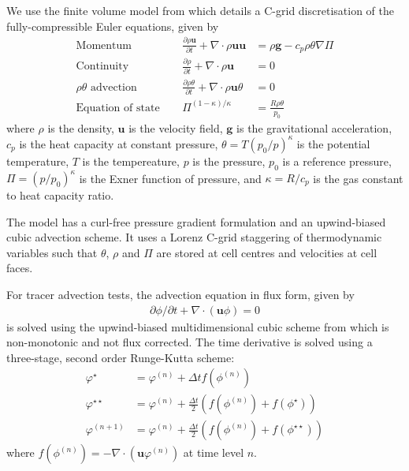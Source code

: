 \documentclass[twocol]{ametsoc}
\begin{document}
We use the finite volume model from \citet{weller-shahrokhi2014} which details a C-grid discretisation of the fully-compressible Euler equations, given by
\begin{subequations}
\begin{align}
	\text{Momentum} &\ &\  	\frac{\partial \rho \bm{u}}{\partial t} + \nabla \cdot \rho \bm{uu} &= \rho \bm{g} - c_p \rho \theta \nabla \Pi \label{eq:momentum} \\
	\text{Continuity} &\ &\	\frac{\partial \rho}{\partial t} + \nabla \cdot \rho \bm{u} &= 0 \\
	\text{\(\rho \theta\) advection} &\ &\ \frac{\partial \rho \theta}{\partial t} + \nabla \cdot \rho \bm{u} \theta &= 0 \\
	\text{Equation of state} &\ &\ \Pi^{(1 - \kappa)/\kappa} &= \frac{R \rho \theta}{p_0}
\end{align}
\end{subequations}
where \(\rho\) is the density, \(\bm{u}\) is the velocity field, \(\bm{g}\) is the gravitational acceleration, \(c_p\) is the heat capacity at constant pressure, \(\theta = T \left(p_0/p\right)^\kappa\) is the potential temperature, \(T\) is the tempereature, \(p\) is the pressure, \(p_0\) is a reference pressure, \(\Pi = \left(p / p_0 \right)^\kappa\) is the Exner function of pressure, and \(\kappa = R/c_p\) is the gas constant to heat capacity ratio.

The model has a curl-free pressure gradient formulation and an upwind-biased cubic advection scheme.  It uses a Lorenz C-grid staggering of thermodynamic variables such that $\theta$, $\rho$ and $\Pi$ are stored at cell centres and velocities at cell faces.

For tracer advection tests, the advection equation in flux form, given by
\begin{align}
\partial \phi / \partial t + \nabla \cdot \left( \bm{u} \phi \right) = 0
\end{align}
is solved using the upwind-biased multidimensional cubic scheme from \citet{weller-shahrokhi2014} which is non-monotonic and not flux corrected.
The time derivative is solved using a three-stage, second order Runge-Kutta scheme:
\begin{subequations}
\begin{align}
	\varphi^\star &= \varphi^{(n)} + \Delta t f(\phi^{(n)}) \\
	\varphi^{\star\star} &= \varphi^{(n)} + \frac{\Delta t}{2} \left( f(\phi^{(n)}) + f(\phi^\star) \right) \\
	\varphi^{(n+1)} &= \varphi^{(n)} + \frac{\Delta t}{2} \left( f(\phi^{(n)}) + f(\phi^{\star\star}) \right)
\end{align}
\end{subequations}
where \(f(\phi^{(n)}) = - \nabla \cdot (\bm{u} \varphi^{(n)})\) at time level \(n\).
\end{document}
